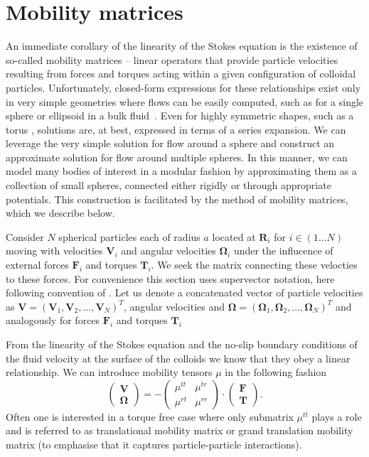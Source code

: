 \documentclass{doctoral}
\newcommand{\mm}[1]{\bm{\mathsf{#1}}} %
\begin{document}
\section{Mobility matrices}

An immediate corollary of the linearity of the Stokes equation is the existence of so-called mobility matrices -- linear operators that provide particle velocities resulting from forces and torques acting within a given configuration of colloidal particles.
Unfortunately, closed-form expressions for these relationships exist only in very simple geometries where flows can be easily computed, such as for a single sphere or ellipsoid in a bulk fluid~\cite{Kim_2013}.
Even for highly symmetric shapes, such as a torus \cite{Goren_1980, Majumdar_1977}, solutions are, at best, expressed in terms of a series expansion.
We can leverage the very simple solution for flow around a sphere and construct an approximate solution for flow around multiple spheres.
In this manner, we can model many bodies of interest in a modular fashion by approximating them as a collection of small spheres, connected either rigidly or through appropriate potentials.
This construction is facilitated by the method of mobility matrices, which we describe below.

Consider $N$ spherical particles each of radius $a$ located at $\bm{R}_i$ for $i \in (1 \dots N)$ moving with velocities $\bm{V}_i$ and angular velocities $\bm{\Omega}_i$ under the influcence of external forces $\bm{F}_i$ and torques $\bm{T}_i$.
We seek the matrix connecting these velocties to these forces.
For convenience this section uses supervector notation, here following convention of \cite{Nagele_2013}.
Let us denote a concatenated vector of particle velocities as $\bm{V} = (\bm{V}_1,\bm{V}_2,\dots,\bm{V}_N)^{T}$, angular velocities and $\bm{\Omega} = (\bm{\Omega}_1,\bm{\Omega}_2,\dots,\bm{\Omega}_N)^{T}$ and analogously for forces $\bm{F}_i$ and torques $\bm{T}_i$ 

From the linearity of the Stokes equation and the no-slip boundary conditions of the fluid velocity at the surface of the colloids we know that they obey a linear relationship.
We can introduce mobility tensors $\mm{\mu}$ in the following fashion
\begin{equation}
    \begin{pmatrix}
        \bm{V} \\
        \bm{\Omega}
    \end{pmatrix}
    = -
    \begin{pmatrix}
        \mm{\mu}^{tt} & \mm{\mu}^{tr} \\
        \mm{\mu}^{rt} & \mm{\mu}^{rr}
    \end{pmatrix}
    \cdot
    \begin{pmatrix}
        \bm{F} \\
        \bm{T}
    \end{pmatrix}
    .
    \label{eqn:mobility-matrix-definition}
\end{equation}
Often one is interested in a torque free case where only submatrix $\mm{\mu}^{tt}$ plays a role and is referred to as translational mobility matrix or grand translation mobility matrix (to emphasise that it captures particle-particle interactions).
\end{document}
